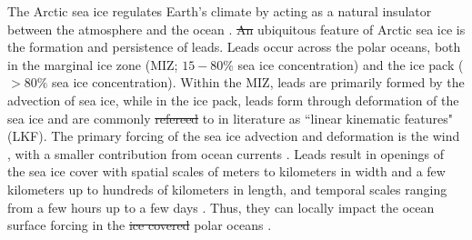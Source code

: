 \documentclass[lineno,sn-basic]{sn-jnl}%
\providecommand{\DIFadd}[1]{{\protect\color{blue}\uwave{#1}}} %
\providecommand{\DIFdel}[1]{{\protect\color{red}\sout{#1}}}                      %
\providecommand{\DIFaddbegin}{} %
\providecommand{\DIFaddend}{} %
\providecommand{\DIFdelbegin}{} %
\providecommand{\DIFdelend}{} %
\newcommand{\DIFscaledelfig}{0.5}
\newlength{\DIFdelgraphicswidth} %
\newlength{\DIFdelgraphicsheight} %
\newcommand{\DIFaddincludegraphics}[2][]{{\color{blue}\fbox{\DIFOincludegraphics[#1]{#2}}}} %
\newcommand{\DIFdelincludegraphics}[2][]{%
\sbox{\DIFdelgraphicsbox}{\DIFOincludegraphics[#1]{#2}}%
\settoboxwidth{\DIFdelgraphicswidth}{\DIFdelgraphicsbox} %
\settoboxtotalheight{\DIFdelgraphicsheight}{\DIFdelgraphicsbox} %
\scalebox{\DIFscaledelfig}{%
\parbox[b]{\DIFdelgraphicswidth}{\usebox{\DIFdelgraphicsbox}\\[-\baselineskip] \rule{\DIFdelgraphicswidth}{0em}}\llap{\resizebox{\DIFdelgraphicswidth}{\DIFdelgraphicsheight}{%
\setlength{\unitlength}{\DIFdelgraphicswidth}%
\begin{picture}(1,1)%
\thicklines\linethickness{2pt} %
{\color[rgb]{1,0,0}\put(0,0){\framebox(1,1){}}}%
{\color[rgb]{1,0,0}\put(0,0){\line( 1,1){1}}}%
{\color[rgb]{1,0,0}\put(0,1){\line(1,-1){1}}}%
\end{picture}%
}\hspace*{3pt}}} %
} %
\DeclareRobustCommand{\DIFaddbegin}{\DIFOaddbegin \let\includegraphics\DIFaddincludegraphics} %
\DeclareRobustCommand{\DIFaddend}{\DIFOaddend \let\includegraphics\DIFOincludegraphics} %
\DeclareRobustCommand{\DIFdelbegin}{\DIFOdelbegin \let\includegraphics\DIFdelincludegraphics} %
\DeclareRobustCommand{\DIFdelend}{\DIFOaddend \let\includegraphics\DIFOincludegraphics} %
\begin{document}


\maketitle


The Arctic sea ice regulates Earth's climate by acting as a natural insulator between the atmosphere and the ocean \citep{Wettlaufer_insulator_1997, Untersteiner_ice_insulator_1961}. \DIFdelbegin \DIFdel{An }\DIFdelend \DIFaddbegin \DIFadd{A }\DIFaddend ubiquitous feature of Arctic sea ice is the formation and persistence of leads. Leads occur across the polar oceans, both in the marginal ice zone (MIZ; $15-80\%$ sea ice concentration) and the ice pack ($>80\%$ sea ice concentration). Within the MIZ, leads are primarily formed by the advection of sea ice, while in the ice pack, leads form through deformation of the sea ice and are commonly \DIFdelbegin \DIFdel{refereed }\DIFdelend \DIFaddbegin \DIFadd{referred }\DIFaddend to in literature as ``linear kinematic features" (LKF). 
The primary forcing of the sea ice advection and deformation is the wind \citep{Linow_lkf_2017, Hutter_scaling_lkf_2018}, with a smaller contribution from ocean currents \citep{Willmes_leads_currents_2023}.
Leads result in openings of the sea ice cover \citep{Rampal_nextsim_2016, Hutchings_model_lkf_2005, Richter_pack_stress_2002} with spatial scales of meters to kilometers in width and a few kilometers up to hundreds of kilometers in length, and temporal scales ranging from a few hours up to a few days \citep{Linow_lkf_2017, Wernecke_Lead_2015, Tschudi_obs_leads_1998}. Thus, they can locally impact the ocean surface forcing in the \DIFdelbegin \DIFdel{ice covered }\DIFdelend \DIFaddbegin \DIFadd{ice-covered }\DIFaddend polar oceans \citep{Lupkes_leads_2008}.
\end{document}

